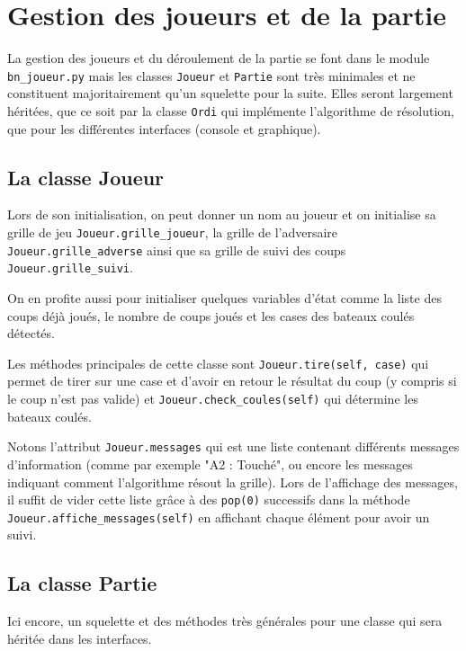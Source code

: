 \chapter{Gestion des joueurs et de la partie}\label{chap_joueurs}

La gestion des joueurs et du déroulement de la partie se font dans le module \texttt{bn\_joueur.py} mais les classes \texttt{Joueur} et \texttt{Partie} sont très minimales et ne constituent majoritairement qu'un squelette pour la suite. Elles seront largement héritées, que ce soit par la classe \texttt{Ordi} qui implémente l'algorithme de résolution, que pour les différentes interfaces (console et graphique).

\section{La classe Joueur}
Lors de son initialisation, on peut donner un nom au joueur et on initialise sa grille de jeu \texttt{Joueur.grille\_joueur}, la grille de l'adversaire \texttt{Joueur.grille\_adverse} ainsi que sa grille de suivi des coups \texttt{Joueur.grille\_suivi}.

On en profite aussi pour initialiser quelques variables d'état comme la liste des coups déjà joués, le nombre de coups joués et les cases des bateaux coulés détectés.

Les méthodes principales de cette classe sont \texttt{Joueur.tire(self, case)} qui permet de tirer sur une case et d'avoir en retour le résultat du coup (y compris si le coup n'est pas valide) et \texttt{Joueur.check\_coules(self)} qui détermine les bateaux coulés. 

\medskip



Notons l'attribut \texttt{Joueur.messages} qui est une liste contenant différents messages d'information (comme par exemple "A2 : Touché", ou encore les messages indiquant comment l'algorithme résout la grille). Lors de l'affichage des messages, il suffit de vider cette liste grâce à des \texttt{pop(0)} successifs dans la méthode \texttt{Joueur.affiche\_messages(self)} en affichant chaque élément pour avoir un suivi.

\section{La classe Partie}
Ici encore, un squelette et des méthodes très générales pour une classe qui sera héritée dans les interfaces.

